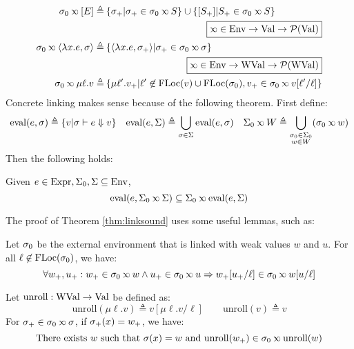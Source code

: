 \begin{align*}
  \ctx_0\semlink[E]\triangleq                            & \: \{\ctx_+|\ctx_+\in\ctx_0\semlink\event\}\cup\{[\event_+]|\event_+\in\ctx_0\semlink\event\}                                      \\
                                                         & \pushright{\fbox{$\semlink\in\Ctx\rightarrow\Value\rightarrow\pset{\Value}$}}                                                      \\
  \ctx_0\semlink\langle\lambda x.e,\ctx\rangle\triangleq & \: \{\langle\lambda x.e,\ctx_+\rangle|\ctx_+\in\ctx_0\semlink\ctx\}                                                                \\
                                                         & \pushright{\fbox{$\semlink\in\Ctx\rightarrow\Walue\rightarrow\pset{\Walue}$}}                                                      \\
  \ctx_0\semlink\mu\ell.v\triangleq                      & \: \{\mu\ell'.v_+|\ell'\not\in\FLoc(v)\cup\FLoc(\ctx_0), v_+\in\ctx_0\semlink v[\ell'/\ell]\}
\end{align*}
Concrete linking makes sense because of the following theorem.
First define:
\[
  \eval(e,\ctx)\triangleq\{v|\ctx\vdash e\Downarrow v\}\quad
  \eval(e,\Sigma)\triangleq\bigcup_{\ctx\in\Sigma}\eval(e,\ctx)\quad
  \Sigma_0\semlink W\triangleq\bigcup_{\substack{\ctx_0\in\Sigma_0\\w\in W}}(\ctx_0\semlink w)
\]
Then the following holds:
\begin{thm}[Advance]\label{thm:linksound}
  Given $e\in\text{Expr},\Sigma_0,\Sigma\subseteq\text{Env}$,
  \[\eval(e,\Sigma_0\semlink\Sigma)\subseteq\Sigma_0\semlink\eval(e,\Sigma)\]
\end{thm}

The proof of Theorem \ref{thm:linksound} uses some useful lemmas, such as:
\begin{lem}
  Let $\sigma_0$ be the external environment that is linked with weak values $w$ and $u$.
  For all $\ell\not\in\text{FLoc}(\sigma_0)$, we have:
  \[\forall w_+,u_+:w_+\in\ctx_0\semlink w\wedge u_+\in\ctx_0\semlink u\Rightarrow w_+[u_+/\ell]\in\ctx_0\semlink w[u/\ell]\]
\end{lem}
\begin{lem}
  Let $\text{unroll}:\text{WVal}\rightarrow\text{Val}$ be defined as:
  \[\text{unroll}(\mu\ell.v)\triangleq v[\mu\ell.v/\ell]\qquad\text{unroll}(v)\triangleq v\]
  For $\ctx_+\in\ctx_0\semlink\ctx$, if $\sigma_+(x)=w_+$, we have:
  \[\text{There exists } w\text{ such that }\ctx(x)=w\text{ and }\text{unroll}(w_+)\in\ctx_0\semlink\text{unroll}(w)\]
\end{lem}


